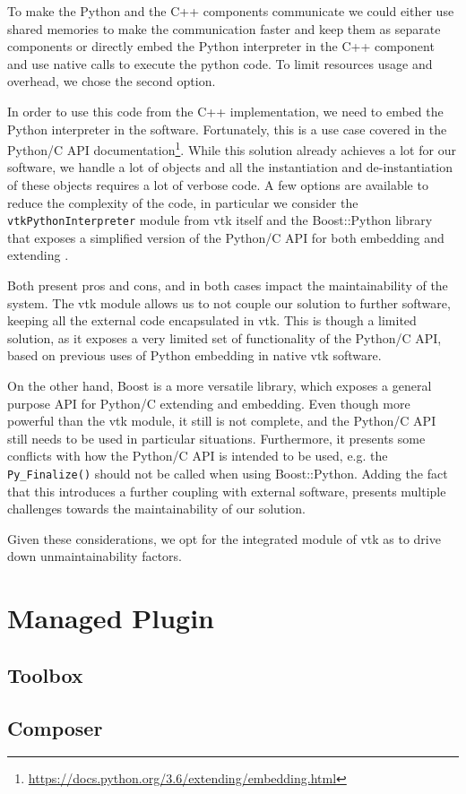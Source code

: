     

To make the Python and the C++ components communicate we could either use shared memories to make the communication faster and keep them as separate components or directly embed the Python interpreter in the C++ component and use native calls to execute the python code. To limit resources usage and overhead, we chose the second option. 

In order to use this code from the C++ implementation, we need to embed the Python interpreter in the software. Fortunately, this is a use case covered in the Python/C API documentation\footnote{\url{https://docs.python.org/3.6/extending/embedding.html}}. While this solution already achieves a lot for our software, we handle a lot of objects and all the instantiation and de-instantiation of these objects requires a lot of verbose code. A few options are available to reduce the complexity of the code, in particular we consider the \verb|vtkPythonInterpreter| module from \acrshort{vtk} itself and the Boost::Python library that exposes a simplified version of the Python/C API for both embedding and extending \cite{abrahams2003building, schaling2011boost}.

Both present pros and cons, and in both cases impact the maintainability of the system. The \acrshort{vtk} module allows us to not couple our solution to further software, keeping all the external code encapsulated in \acrshort{vtk}. This is though a limited solution, as it exposes a very limited set of functionality of the Python/C API, based on previous uses of Python embedding in native \acrshort{vtk} software.

On the other hand, Boost is a more versatile library, which exposes a general purpose API for Python/C extending and embedding. Even though more powerful than the \acrshort{vtk} module, it still is not complete, and the Python/C API still needs to be used in particular situations. Furthermore, it presents some conflicts with how the Python/C API is intended to be used, e.g. the \verb|Py_Finalize()| should not be called when using Boost::Python. Adding the fact that this introduces a further coupling with external software, presents multiple challenges towards the maintainability of our solution.

Given these considerations, we opt for the integrated module of \acrshort{vtk} as to drive down unmaintainability factors.

\section{Managed Plugin}
\label{sec:design-managed-plugin}

\subsection{Toolbox}
\label{sec:design-toolbox}

\subsection{Composer}
\label{sec:design-uicomposer}